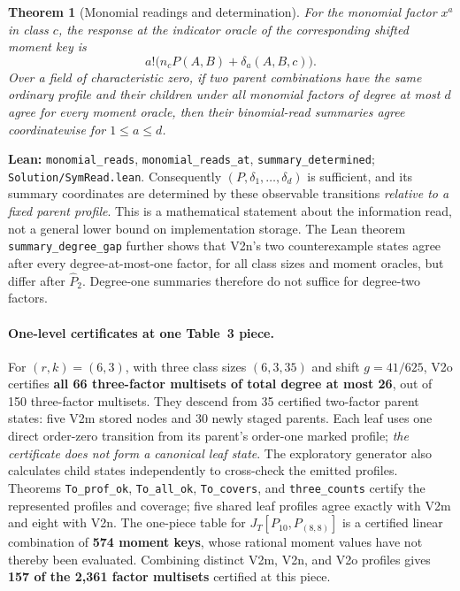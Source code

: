 \documentclass[11pt]{article}
\newtheorem{theorem}{Theorem}[section]
\newcommand{\code}[1]{\texttt{#1}}
\begin{document}
\begin{theorem}[Monomial readings and determination]\label{thm:v2o-necessary}
For the monomial factor $x^a$ in class $c$, the response at the indicator
oracle of the corresponding shifted moment key is
\begin{equation}\label{eq:v2o-monomial}
 a!\bigl(n_c P(A,B)+\delta_a(A,B,c)\bigr).
\end{equation}
Over a field of characteristic zero, if two parent combinations have the
same ordinary profile and their children under all monomial factors of
degree at most $d$ agree for every moment oracle, then their binomial-read
summaries agree coordinatewise for $1\le a\le d$.
\end{theorem}
\noindent\textbf{Lean:} \code{monomial\_reads},
\code{monomial\_reads\_at}, \code{summary\_determined};
\nolinkurl{Solution/SymRead.lean}.
Consequently $(P,\delta_1,\ldots,\delta_d)$ is sufficient, and its summary
coordinates are determined by these observable transitions \emph{relative
to a fixed parent profile}. This is a mathematical statement about the
information read, not a general lower bound on implementation storage.
The Lean theorem \code{summary\_degree\_gap} further shows that V2n's
two counterexample states agree after every degree-at-most-one factor, for
all class sizes and moment oracles, but differ after $\widehat P_2$.
Degree-one summaries therefore do not suffice for degree-two factors.

\paragraph{One-level certificates at one Table~3 piece.}
For $(r,k)=(6,3)$, with three class sizes $(6,3,35)$ and shift
$g=41/625$, V2o certifies \textbf{all 66 three-factor multisets of total
degree at most 26}, out of 150 three-factor multisets. They descend from
35 certified two-factor parent states: five V2m stored nodes and 30
newly staged parents. Each leaf uses one direct order-zero transition from
its parent's order-one marked profile; \emph{the certificate does not form
a canonical leaf state}. The exploratory generator also calculates child
states independently to cross-check the emitted profiles.
Theorems \code{To\_prof\_ok}, \code{To\_all\_ok}, \code{To\_covers},
and \code{three\_counts} certify the represented profiles and coverage;
five shared leaf profiles agree exactly with V2m and eight with V2n.
The one-piece table for $J_T[P_{10},P_{(8,8)}]$ is a certified linear
combination of \textbf{574 moment keys}, whose rational moment values have
not thereby been evaluated. Combining distinct V2m, V2n, and V2o profiles
gives \textbf{157 of the 2,361 factor multisets} certified at this piece.
\end{document}

